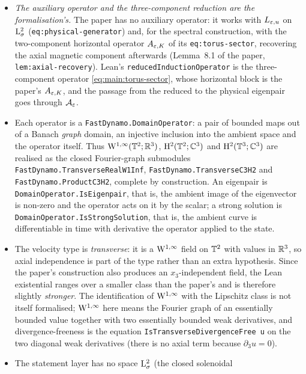 \begin{itemize}
  \item \emph{The auxiliary operator and the three-component reduction are the
    formalisation's.}  The paper has no auxiliary operator: it works with
    $L_{\varepsilon,u}$ on $\mathrm{L}^2_\sigma$ (\texttt{eq:physical-generator}) and, for the
    spectral construction, with the two-component horizontal operator $A_{\varepsilon,K}$ of
    its \texttt{eq:torus-sector}, recovering the axial magnetic component afterwards
    (Lemma~8.1 of the paper, \texttt{lem:axial-recovery}).  Lean's
    \texttt{reducedInductionOperator} is the three-component operator
    \eqref{eq:main:torus-sector}, whose horizontal block is the paper's $A_{\varepsilon,K}$,
    and the passage from the reduced to the physical eigenpair goes through
    $\mathcal{A}_\varepsilon$.
  \item Each operator is a \texttt{FastDynamo.DomainOperator}: a pair of
    bounded maps out of a Banach \emph{graph} domain, an injective inclusion
    into the ambient space and the operator itself.  Thus
    $\mathrm{W}^{1,\infty}(\mathbb{T}^2;\mathbb{R}^3)$, $\mathrm{H}^2(\mathbb{T}^2;\mathbb{C}^3)$ and $\mathrm{H}^2(\mathbb{T}^3;\mathbb{C}^3)$ are
    realised as the closed Fourier-graph submodules
    \texttt{FastDynamo.TransverseRealW1Inf},
    \texttt{FastDynamo.TransverseC3H2} and \texttt{FastDynamo.ProductC3H2},
    complete by construction.  An eigenpair is
    \texttt{DomainOperator.IsEigenpair}, that is, the ambient image of the
    eigenvector is non-zero and the operator acts on it by the scalar; a
    strong solution is \texttt{DomainOperator.IsStrongSolution}, that is, the
    ambient curve is differentiable in time with derivative the operator
    applied to the state.
  \item The velocity type is \emph{transverse}: it is a $\mathrm{W}^{1,\infty}$ field
    on $\mathbb{T}^2$ with values in $\mathbb{R}^3$, so axial independence is part of the type
    rather than an extra hypothesis.  Since the paper's construction also
    produces an $x_3$-independent field, the Lean existential ranges over a
    smaller class than the paper's and is therefore slightly
    \emph{stronger}.  The identification of $\mathrm{W}^{1,\infty}$ with the Lipschitz
    class is not itself formalised; $\mathrm{W}^{1,\infty}$ here means the Fourier
    graph of an essentially bounded value together with two essentially bounded
    weak derivatives, and divergence-freeness is the equation
    \texttt{IsTransverseDivergenceFree u} on the two diagonal weak
    derivatives (there is no axial term because $\partial_3u=0$).
  \item The statement layer has no space $\mathrm{L}^2_\sigma$ (the closed solenoidal

\end{itemize}
